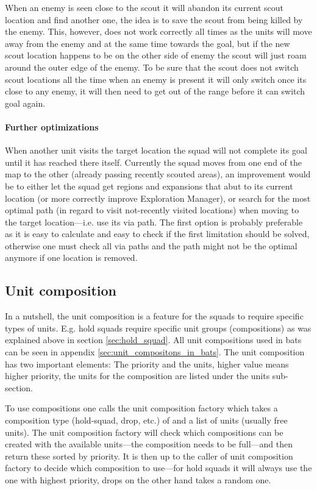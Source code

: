 When an enemy is seen close to the scout it will abandon its current scout location and find another one, the idea is to save the scout from being killed by the enemy. This, however, does not work correctly all times as the units will move away from the enemy and at the same time towards the goal, but if the new scout location happens to be on the other side of enemy the scout will just roam around the outer edge of the enemy. To be sure that the scout does not switch scout locations all the time when an enemy is present it will only switch once its close to any enemy, it will then need to get out of the range before it can switch goal again.

\paragraph{Further optimizations}
When another unit visits the target location the squad will not complete its goal until it has reached there itself. Currently the squad moves from one end of the map to the other (already passing recently scouted areas), an improvement would be to either let the squad get regions and expansions that abut to its current location (or more correctly improve Exploration Manager), or search for the most optimal path (in regard to visit not-recently visited locations) when moving to the target location—i.e. use its via path. The first option is probably preferable as it is easy to calculate and easy to check if the first limitation should be solved, otherwise one must check all via paths and the path might not be the optimal anymore if one location is removed.

\subsection{Unit composition}
\label{sec:unit_composition}
In a nutshell, the unit composition is a feature for the squads to require specific types of units. E.g. hold squads require specific unit groups (compositions) as was explained above in section \ref{sec:hold_squad}. All unit compositions used in bats can be seen in appendix \ref{sec:unit_compositons_in_bats}. The unit composition has two important elements: The priority and the units, higher value means higher priority, the units for the composition are listed under the units sub-section.

To use compositions one calls the unit composition factory which takes a composition type (hold-squad, drop, etc.) of and a list of units (usually free units). The unit composition factory will check which compositions can be created with the available units—the composition needs to be full—and then return these sorted by priority. It is then up to the caller of unit composition factory to decide which composition to use—for hold squads it will always use the one with highest priority, drops on the other hand takes a random one.

